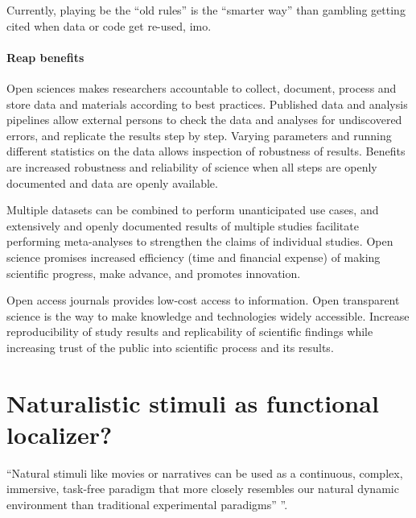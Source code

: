 %
Currently, playing be the ``old rules'' is the ``smarter way'' than gambling
getting cited when data or code get re-used, imo.



\paragraph{Reap benefits}

%
Open sciences makes researchers accountable to collect, document, process and
store data and materials according to best practices.
%
Published data and analysis pipelines allow external persons to check the data
and analyses for undiscovered errors, and replicate the results step by step.
%
Varying parameters and running different statistics on the data allows
inspection of robustness of results.
%
Benefits are increased robustness and reliability of science when all steps are
openly documented and data are openly available.

%
Multiple datasets can be combined to perform unanticipated use cases, and
extensively and openly documented results of multiple studies facilitate
performing meta-analyses to strengthen the claims of individual studies.
%
Open science promises increased efficiency (time and financial expense) of
making scientific progress, make advance, and promotes innovation.

%
Open access journals provides low-cost access to information.
%
Open transparent science is the way to make knowledge and technologies
widely accessible.
%
Increase reproducibility of study results and replicability of scientific
findings while increasing trust of the public into scientific process and its
results.



\pagebreak



\section{Naturalistic stimuli as functional localizer?}



``Natural stimuli like movies \citep{eickhoff2020towards,
hasson2008neurocinematics, sonkusare2019naturalistic} or narratives
\citep{hamilton2018revolution, honey2012not, lerner2011topographic,
silbert2014coupled, wilson2008beyond} can be used as a continuous, complex,
immersive, task-free paradigm that more closely resembles our natural dynamic
environment than traditional experimental paradigms''
\citep{haeusler2022processing}''.



